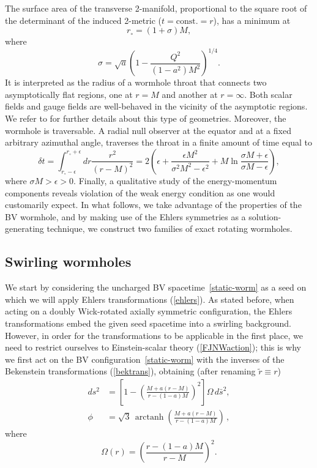 \documentclass[aps,preprint,groupedaddress,nofootinbib,superscriptaddress,showkeys,showpacs,eqsecnum,amsmath,amssymb]{revtex4-1}
\DeclareMathOperator\arctanh{arctanh}
\begin{document}
The surface area of the transverse 2-manifold, proportional to the square root of the determinant of the induced 2-metric ($t=\mathrm{const.}=r$), has a minimum at
\begin{equation}
r_{\circ}=(1+\sigma)M,\label{eq:BVthroat}
\end{equation}
where 
\begin{equation}
    \sigma = \sqrt{a}\left(1 - \frac{Q^2}{(1-a^2)M^2}\right)^{1/4}.
\end{equation}
It is interpreted as the radius of a wormhole throat that connects two asymptotically flat regions, one at $r=M$ and another at $r=\infty$. Both scalar fields and gauge fields are well-behaved in the vicinity of the asymptotic regions. We refer to  \cite{Barrientos:2022avi,Anabalon:2012tu} for further details about this type of geometries. Moreover, the wormhole is traversable. A radial null observer at the equator and at a fixed arbitrary azimuthal angle, traverses the throat in a finite amount of time equal to
\begin{equation}
\delta t= \int_{r_\circ-\epsilon}^{r_\circ + \epsilon}dr \frac{r^2}{(r-M)^2} = 2\left( \epsilon + \frac{\epsilon M^2}{\sigma^2 M^2 - \epsilon^2}+M\ln \frac{\sigma M+\epsilon}{\sigma M -\epsilon}\right),\label{eq:travBVstatic}
\end{equation}
where $\sigma M > \epsilon >0$. Finally, a qualitative study of the energy-momentum components reveals violation of the weak energy condition as one would customarily expect. In what follows, we take advantage of the properties of the BV wormhole, and by making use of the Ehlers symmetries as a solution-generating technique, we construct two families of exact rotating wormholes. 

\subsection{Swirling wormholes}

We start by considering the uncharged BV spacetime~\eqref{static-worm} as a seed on which we will apply Ehlers transformations (\ref{ehlers}). As stated before, when acting on a doubly Wick-rotated axially symmetric configuration, the Ehlers transformations embed the given seed spacetime into a swirling background. However, in order for the transformations to be applicable in the first place, we need to restrict ourselves to Einstein-scalar theory (\ref{FJNWaction}); this is why we first act on the BV configuration~\eqref{static-worm} with the inverses of the Bekenstein transformations (\ref{bektrans}), obtaining (after renaming $\tilde{r}\equiv r$)
\begin{subequations}
\begin{align}
ds^2 &=\left[1 - \left(\frac{M + a(r-M)}{r-(1-a)M}\right)^2\right] \Omega\,
d\bar{s}^2, \\ 
\phi &= \sqrt{3} \, \arctanh\left(\frac{M + a(r-M)}{r-(1-a)M}\right) \,,
\end{align}\label{BVEF} 
\end{subequations}
where 
\begin{equation}
    \Omega(r)=\left( \frac{r-(1-a)M}{r-M}\right)^2.\label{eq:Omega}
\end{equation}
\end{document}
